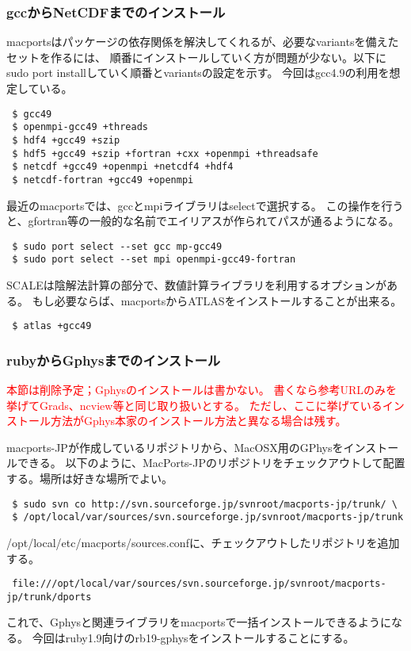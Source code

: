 \subsubsection{gccからNetCDFまでのインストール}

macportsはパッケージの依存関係を解決してくれるが、必要なvariantsを備えたセットを作るには、
順番にインストールしていく方が問題が少ない。以下にsudo port installしていく順番とvariantsの設定を示す。
今回はgcc4.9の利用を想定している。
\begin{verbatim}
 $ gcc49
 $ openmpi-gcc49 +threads
 $ hdf4 +gcc49 +szip
 $ hdf5 +gcc49 +szip +fortran +cxx +openmpi +threadsafe
 $ netcdf +gcc49 +openmpi +netcdf4 +hdf4
 $ netcdf-fortran +gcc49 +openmpi
\end{verbatim}

最近のmacportsでは、gccとmpiライブラリはselectで選択する。
この操作を行うと、gfortran等の一般的な名前でエイリアスが作られてパスが通るようになる。
\begin{verbatim}
 $ sudo port select --set gcc mp-gcc49
 $ sudo port select --set mpi openmpi-gcc49-fortran
\end{verbatim}

SCALEは陰解法計算の部分で、数値計算ライブラリを利用するオプションがある。
もし必要ならば、macportsからATLASをインストールすることが出来る。
\begin{verbatim}
 $ atlas +gcc49
\end{verbatim}

\subsubsection{rubyからGphysまでのインストール}

\textcolor{red}{\large 本節は削除予定；Gphysのインストールは書かない。
書くなら参考URLのみを挙げてGrads、ncview等と同じ取り扱いとする。
ただし、ここに挙げているインストール方法がGphys本家のインストール方法と異なる場合は残す。}

macports-JPが作成しているリポジトリから、MacOSX用のGPhysをインストールできる。
以下のように、MacPorts-JPのリポジトリをチェックアウトして配置する。場所は好きな場所でよい。
\begin{verbatim}
 $ sudo svn co http://svn.sourceforge.jp/svnroot/macports-jp/trunk/ \
 $ /opt/local/var/sources/svn.sourceforge.jp/svnroot/macports-jp/trunk
\end{verbatim}
/opt/local/etc/macports/sources.confに、チェックアウトしたリポジトリを追加する。
\begin{verbatim}
 file:///opt/local/var/sources/svn.sourceforge.jp/svnroot/macports-jp/trunk/dports
\end{verbatim}
これで、Gphysと関連ライブラリをmacportsで一括インストールできるようになる。
今回はruby1.9向けのrb19-gphysをインストールすることにする。


